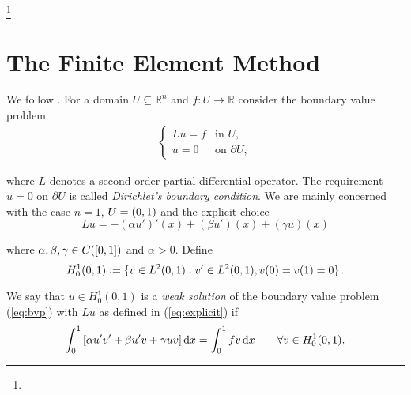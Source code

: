 




\begin{abstract}

\end{abstract}

\title{}
\author{Yannis B\"{a}hni}
\address[Yannis B\"{a}hni]{University of Zurich, R\"{a}mistrasse 71, 8006 Zurich}
\thanks{}
\maketitle

\tableofcontents
\listoffigures

\mainsectionstyle

\section{The Finite Element Method}
We follow \cite{quarteroni2000numerical}. For a domain $U \subseteq \mathbb{R}^n$ and $f: U \to \mathbb{R}$ consider the boundary value problem
\begin{align}
	\begin{cases}
		Lu = f & \text{in } U,\\
		u = 0 & \text{on } \partial U,
	\end{cases}
	\label{eq:bvp}
\end{align}

\noindent where $L$ denotes a second-order partial differential operator. The requirement $u = 0$ on $\partial U$ is called \emph{Dirichlet's boundary condition}. We are mainly concerned with the case $n = 1$, $U = \intoo{0,1}$ and the explicit choice 
\begin{equation}
	Lu = -(\alpha u')'(x) + (\beta u')(x) + (\gamma u)(x)
	\label{eq:explicit}
\end{equation}

\noindent where $\alpha,\beta,\gamma \in C(\intcc{0,1})$ and $\alpha > 0$. Define 
\begin{equation}
	H_0^1(0,1) := \cbr[0]{v \in L^2(0,1) : v' \in L^2(0,1), v(0) = v(1) = 0}.
	\label{}
\end{equation}

We say that $u \in H^1_0(0,1)$ is a \emph{weak solution} of the boundary value problem (\ref{eq:bvp}) with $Lu$ as defined in (\ref{eq:explicit}) if
\begin{equation}
	\int_0^1\sbr[0]{\alpha u'v' + \beta u' v + \gamma uv }\d x = \int_0^1 fv \d x \qquad \forall v \in H^1_0(0,1).
	\label{}
\end{equation}







\originalsectionstyle

\appendix
\begin{appendix}

\end{appendix}

